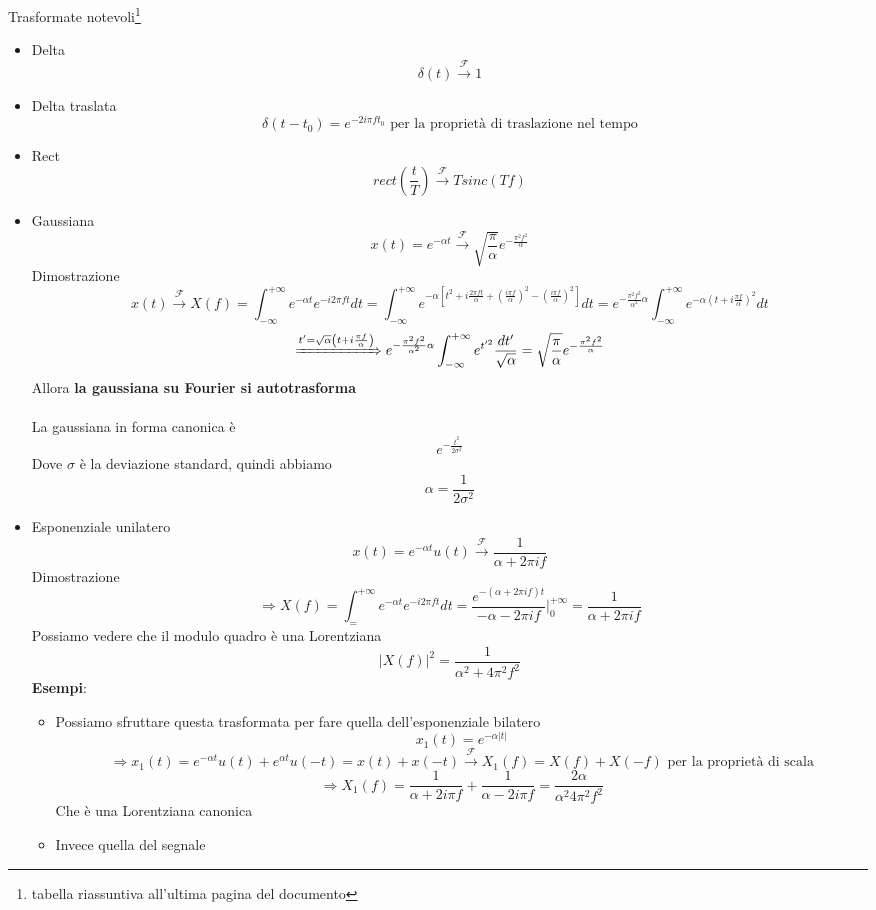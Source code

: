 \documentclass{article}
\newcommand{\accapo}{\\\hspace*{1cm}\\}
\newcommand{\trasformata}{\xrightarrow{\mathscr{F}}}
\begin{document}
Trasformate notevoli\footnote{tabella riassuntiva all'ultima pagina del documento}
\begin{itemize}
    \item Delta
        \[\delta(t)\trasformata 1\]
    \item Delta traslata
        \[\delta(t-t_0)=e^{-2i\pi f t_0}\text{ per la proprietà di traslazione nel tempo}\]
    \item Rect
        \[rect\left(\frac{t}{T}\right)\trasformata Tsinc(Tf)\]
    \item Gaussiana
        \[x(t)=e^{-\alpha t}\trasformata \sqrt{\frac{\pi}{\alpha}}e^{-\frac{\pi^2 f^2}{\alpha}}\]
        Dimostrazione
        \[x(t)\trasformata X(f)=\int_{-\infty}^{+\infty}e^{-\alpha t}e^{-i2\pi ft}dt=\int_{-\infty}^{+\infty}e^{-\alpha\left[t^2+i\frac{2\pi ft}{\alpha}+{\left(\frac{i\pi f}{\alpha}\right)}^2-{\left(\frac{i\pi f}{\alpha}\right)}^2\right]}dt=e^{-\frac{\pi^2 f^2}{\alpha^2}\alpha}\int_{-\infty}^{+\infty}e^{-\alpha{\left(t+i\frac{\pi f}{\alpha}\right)}^2}dt\]
        \[\xRightarrow{t'=\sqrt{\alpha}\left(t+i\frac{\pi f}{\alpha}\right)}e^{-\frac{\pi^2 f^2}{\alpha^2}\alpha}\int_{-\infty}^{+\infty}e^{t'^2}\frac{dt'}{\sqrt{\alpha}}=\sqrt{\frac{\pi}{\alpha}}e^{-\frac{\pi^2 f^2}{\alpha}}\]
        Allora \textbf{la gaussiana su Fourier si autotrasforma}\accapo
        La gaussiana in forma canonica è
        \[e^{-\frac{t^2}{2\sigma^2}}\]
        Dove $\sigma$ è la deviazione standard, quindi abbiamo
        \[\alpha=\frac{1}{2\sigma^2}\]
    \item Esponenziale unilatero
        \[x(t)=e^{-\alpha t}u(t)\trasformata \frac{1}{\alpha+2\pi if}\]
        Dimostrazione
        \[\Rightarrow X(f)=\int_=^{+\infty}e^{-\alpha t}e^{-i2\pi ft}dt=\frac{e^{-(\alpha+2\pi if)t}}{-\alpha-2\pi if}\Bigg|_0^{+\infty}=\frac{1}{\alpha+2\pi if}\]
        Possiamo vedere che il modulo quadro è una Lorentziana
        \[|X(f)|^2=\frac{1}{\alpha^2+4\pi^2 f^2}\]
        \textbf{Esempi}:
        \begin{itemize}
            \item Possiamo sfruttare questa trasformata per fare quella dell'esponenziale bilatero
                \[x_1(t)=e^{-\alpha|t|}\]
                \[\Rightarrow x_1(t)=e^{-\alpha t}u(t)+e^{\alpha t}u(-t)=x(t)+x(-t)\trasformata X_1(f)=X(f)+X(-f)\text{ per la proprietà di scala}\]
                \[\Rightarrow X_1(f)=\frac{1}{\alpha+2i\pi f}+\frac{1}{\alpha-2i\pi f}=\frac{2\alpha}{\alpha^2 4\pi^2 f^2}\]
                Che è una Lorentziana canonica
            \item Invece quella del segnale

\end{itemize}
\end{itemize}
\end{document}
